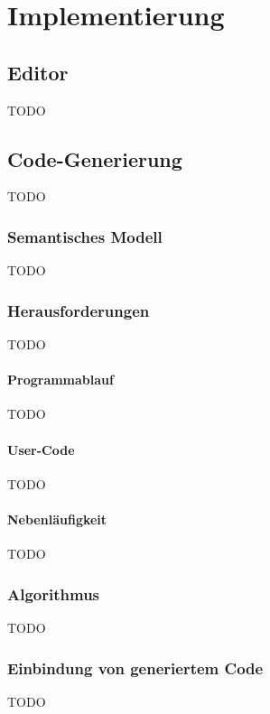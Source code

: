 \chapter{Implementierung}
\label{chap:Implementierung}

\section{Editor}
TODO

\section{Code-Generierung}
TODO

\subsection{Semantisches Modell}
TODO

\subsection{Herausforderungen}
TODO

\subsubsection{Programmablauf}
TODO

\subsubsection{User-Code}
TODO

\subsubsection{Nebenläufigkeit}
TODO

\subsection{Algorithmus}
TODO

\subsection{Einbindung von generiertem Code}
TODO